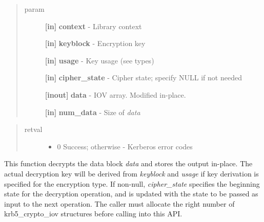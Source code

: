 \documentclass[letterpaper,10pt,english]{sphinxmanual}
\begin{document}
\begin{fulllineitems}
\label{appdev/refs/api/krb5_c_decrypt_iov:krb5_c_decrypt_iov}
\end{fulllineitems}

\begin{quote}\begin{description}
\item[{param}] \leavevmode
\textbf{{[}in{]}} \textbf{context} - Library context

\textbf{{[}in{]}} \textbf{keyblock} - Encryption key

\textbf{{[}in{]}} \textbf{usage} - Key usage (see  types)

\textbf{{[}in{]}} \textbf{cipher\_state} - Cipher state; specify NULL if not needed

\textbf{{[}inout{]}} \textbf{data} - IOV array. Modified in-place.

\textbf{{[}in{]}} \textbf{num\_data} - Size of \emph{data}

\end{description}\end{quote}
\begin{quote}\begin{description}
\item[{retval}] \leavevmode\begin{itemize}
\item {} 
0   Success; otherwise - Kerberos error codes

\end{itemize}

\end{description}\end{quote}

This function decrypts the data block \emph{data} and stores the output in-place. The actual decryption key will be derived from \emph{keyblock} and \emph{usage} if key derivation is specified for the encryption type. If non-null, \emph{cipher\_state} specifies the beginning state for the decryption operation, and is updated with the state to be passed as input to the next operation. The caller must allocate the right number of krb5\_crypto\_iov structures before calling into this API.
\end{document}
